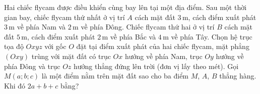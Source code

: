 \begin{ex}%
	Hai chiếc flycam được điều khiển cùng bay lên tại một địa điểm. Sau một thời gian bay, chiếc flycam thứ nhất ở vị trí $A$ cách mặt đất $3\,$m, cách điểm xuất phát $3\,$m về phía Nam và $2\,$m về phía Đông. Chiếc flycam thứ hai ở vị trí $B$ cách mặt đất $5\,$m, cách điểm xuất phát $2\,$m về phía Bắc và $4\,$m về phía Tây. Chọn hệ trục tọa độ $Oxyz$ với gốc $O$ đặt tại điểm xuất phát của hai chiếc flycam, mặt phẳng $(Oxy)$ trùng với mặt đất có trục $Ox$ hướng về phía Nam, trục $Oy$ hướng về phía Đông và trục $Oz$ hướng thẳng đứng lên trời (đơn vị lấy theo mét). Gọi $M(a;b;c)$ là một điểm nằm trên mặt đất sao cho ba điểm $M$, $A$, $B$ thẳng hàng. Khi đó $2a+b+c$ bằng?
\end{ex}

